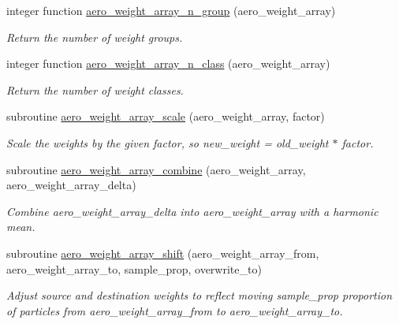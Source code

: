 \begin{DoxyCompactItemize}
integer function \mbox{\hyperlink{namespacepmc__aero__weight__array_ac03a66965bebb2e5b699f16acc021962}{aero\+\_\+weight\+\_\+array\+\_\+n\+\_\+group}} (aero\+\_\+weight\+\_\+array)
\begin{DoxyCompactList}\small\item\em Return the number of weight groups. \end{DoxyCompactList}\item 
integer function \mbox{\hyperlink{namespacepmc__aero__weight__array_a51061757ff964272d7375d50a99d07a7}{aero\+\_\+weight\+\_\+array\+\_\+n\+\_\+class}} (aero\+\_\+weight\+\_\+array)
\begin{DoxyCompactList}\small\item\em Return the number of weight classes. \end{DoxyCompactList}\item 
subroutine \mbox{\hyperlink{namespacepmc__aero__weight__array_a5ecd5778c018848c999ef89b28f5940f}{aero\+\_\+weight\+\_\+array\+\_\+scale}} (aero\+\_\+weight\+\_\+array, factor)
\begin{DoxyCompactList}\small\item\em Scale the weights by the given factor, so {\ttfamily new\+\_\+weight = old\+\_\+weight $\ast$ factor}. \end{DoxyCompactList}\item 
subroutine \mbox{\hyperlink{namespacepmc__aero__weight__array_ac29cb102e3495fadc37eca9347b519b5}{aero\+\_\+weight\+\_\+array\+\_\+combine}} (aero\+\_\+weight\+\_\+array, aero\+\_\+weight\+\_\+array\+\_\+delta)
\begin{DoxyCompactList}\small\item\em Combine {\ttfamily aero\+\_\+weight\+\_\+array\+\_\+delta} into {\ttfamily aero\+\_\+weight\+\_\+array} with a harmonic mean. \end{DoxyCompactList}\item 
subroutine \mbox{\hyperlink{namespacepmc__aero__weight__array_ab91ec24f000d4b6503e6817a84f2da11}{aero\+\_\+weight\+\_\+array\+\_\+shift}} (aero\+\_\+weight\+\_\+array\+\_\+from, aero\+\_\+weight\+\_\+array\+\_\+to, sample\+\_\+prop, overwrite\+\_\+to)
\begin{DoxyCompactList}\small\item\em Adjust source and destination weights to reflect moving {\ttfamily sample\+\_\+prop} proportion of particles from {\ttfamily aero\+\_\+weight\+\_\+array\+\_\+from} to {\ttfamily aero\+\_\+weight\+\_\+array\+\_\+to}. \end{DoxyCompactList}\item 

\end{DoxyCompactItemize}
